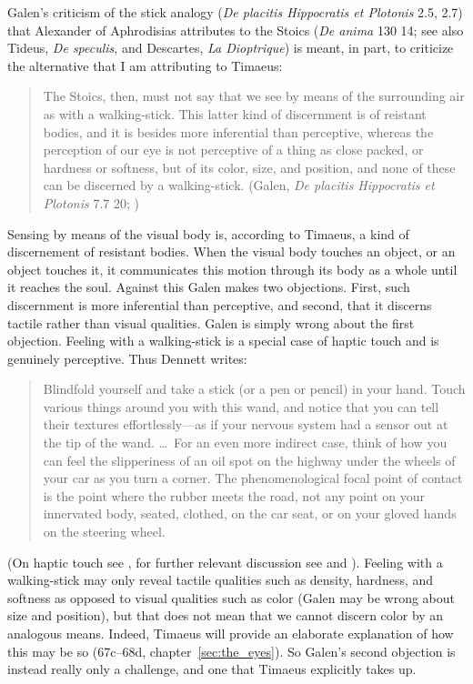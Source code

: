 Galen's criticism of the stick analogy (\emph{De placitis Hippocratis et Plotonis} 2.5, 2.7) that Alexander of Aphrodisias attributes to the Stoics (\emph{De anima} 130 14; see also Tideus, \emph{De speculis}, and Descartes, \emph{La Dioptrique}) is meant, in part, to criticize the alternative that I am attributing to Timaeus:
\begin{quote}
	The Stoics, then, must not say that we see by means of the surrounding air as with a walking-stick. This latter kind of discernment is of reistant bodies, and it is besides more inferential than perceptive, whereas the perception of our eye is not perceptive of a thing as close packed, or hardness or softness, but of its color, size, and position, and none of these can be discerned by a walking-stick. (Galen, \emph{De placitis Hippocratis et Plotonis} 7.7 20; \citealt[475]{Lacy:1980mk})
\end{quote}
Sensing by means of the visual body is, according to Timaeus, a kind of discernement of resistant bodies. When the visual body touches an object, or an object touches it, it communicates this motion through its body as a whole until it reaches the soul. Against this Galen makes two objections. First, such discernment is more inferential than perceptive, and second, that it discerns tactile rather than visual qualities. Galen is simply wrong about the first objection. Feeling with a walking-stick is a special case of haptic touch and is genuinely perceptive. Thus Dennett writes:
\begin{quote}
	Blindfold yourself and take a stick (or a pen or pencil) in your hand. Touch various things around you with this wand, and notice that you can tell their textures effortlessly---as if your nervous system had a sensor out at the tip of the wand. \ldots\ For an even more indirect case, think of how you can feel the slipperiness of an oil spot on the highway under the wheels of your car as you turn a corner. The phenomenological focal point of contact is the point where the rubber meets the road, not any point on your innervated body, seated, clothed, on the car seat, or on your gloved hands on the steering wheel. \citep[47]{Dennett:1993ce}
\end{quote}
(On haptic touch see \citealt{Lederman:1987fr}, for further relevant discussion see \citealt{Fulkerson:2014ek} and \citealt[chapters 1--2]{Kalderon:2018oe}). Feeling with a walking-stick may only reveal tactile qualities such as density, hardness, and softness as opposed to visual qualities such as color (Galen may be wrong about size and position), but that does not mean that we cannot discern color by an analogous means. Indeed, Timaeus will provide an elaborate explanation of how this may be so (67c–68d, chapter~\ref{sec:the_eyes}). So Galen's second objection is instead really only a challenge, and one that Timaeus explicitly takes up.


